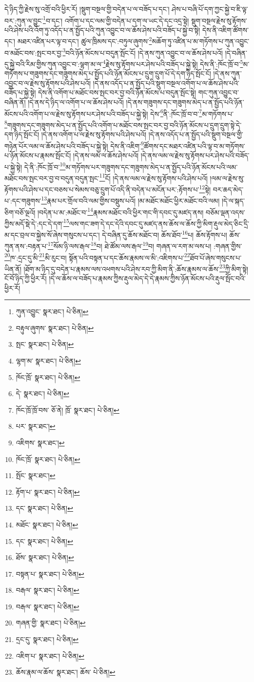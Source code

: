 དེ་ཉིད་ཀྱི་རྗེས་སུ་འགྲོ་བའི་ཕྱིར་རོ། །སྡུག་བསྔལ་གྱི་བདེན་པ་ལ་བཟོད་པ་དང་། ཤེས་པ་བཞི་པོ་དག་ཀྱང་སྐྱེ་བ་ཇི་ལྟ་བར་:ཀུན་ལ་བྱུང་\footnote{ཀུན་འབྱུང་  སྣར་ཐང་།  པེ་ཅིན། }བ་དང་། འགོག་པ་དང་ལམ་གྱི་བདེན་པ་དག་ལ་ཡང་དེ་དང་འདྲ་སྟེ། སྡུག་བསྔལ་རྗེས་སུ་རྟོགས་པའི་ཤེས་པའི་འོག་ཏུ་འདོད་པ་ན་སྤྱོད་པའི་ཀུན་འབྱུང་བ་ལ་ཆོས་ཤེས་པའི་བཟོད་པ་སྐྱེ་བ་སྟེ། དེས་ནི་འཇིག་ཚོགས་དང་། མཐར་འཛིན་པར་ལྟ་བ་དང་། ཚུལ་ཁྲིམས་དང་:བཏུལ་ཞུགས་\footnote{བརྟུལ་ཞུགས་  སྣར་ཐང་།  པེ་ཅིན། }མཆོག་ཏུ་འཛིན་པ་མ་གཏོགས་པ་ཀུན་འབྱུང་བ་མཐོང་བས་:སྤང་བར་བྱ་\footnote{སྤང་  སྣར་ཐང་།  པེ་ཅིན། }བའི་ཉོན་མོངས་པ་བདུན་སྤོང་ངོ། །དེ་ནས་ཀུན་འབྱུང་བ་ལ་ཆོས་ཤེས་པའོ། །དེ་བཞིན་དུ་སྐྱེ་བའི་རིམ་གྱིས་ཀུན་འབྱུང་བ་:ལྷག་མ་ལ་\footnote{ལྷག་མ་  སྣར་ཐང་།  པེ་ཅིན། }རྗེས་སུ་རྟོགས་པར་ཤེས་པའི་བཟོད་པ་སྐྱེ་སྟེ། དེས་ནི་:ཁོང་ཁྲོ་བ་\footnote{ཁོང་ཁྲོ་  སྣར་ཐང་།  པེ་ཅིན། }མ་གཏོགས་པ་གཟུགས་དང་གཟུགས་མེད་པ་སྤྱོད་པའི་ཉོན་མོངས་པ་དྲུག་དྲུག་པོ་དེ་དག་ཉིད་སྤོང་ངོ། །དེ་ནས་ཀུན་འབྱུང་བ་ལ་རྗེས་སུ་རྟོགས་པའི་ཤེས་པའོ། །དེ་ནས་འདོད་པ་ན་སྤྱོད་པའི་སྡུག་བསྔལ་འགོག་པ་ལ་ཆོས་ཤེས་པའི་བཟོད་པ་སྐྱེ་སྟེ། དེས་ནི་འགོག་པ་མཐོང་བས་སྤང་བར་བྱ་བའི་ཉོན་མོངས་པ་བདུན་སྤོང་སྟེ། གང་ཀུན་འབྱུང་བ་བཞིན་ནོ། །དེ་ནས་དེ་ཉིད་ལ་འགོག་པ་ལ་ཆོས་ཤེས་པའོ། །དེ་ནས་གཟུགས་དང་གཟུགས་མེད་པ་ན་སྤྱོད་པའི་ཉོན་མོངས་པའི་འགོག་པ་ལ་རྗེས་སུ་རྟོགས་པར་ཤེས་པའི་བཟོད་པ་སྐྱེ་སྟེ། དེས་\footnote{དེ་  སྣར་ཐང་།  པེ་ཅིན། }ནི་:ཁོང་ཁྲོ་བ་བ་\footnote{ཁོང་ཁྲོ་ཁྲོ་བས་  ཅོ་ནེ། ཁྲོ་  སྣར་ཐང་།  པེ་ཅིན། }མ་གཏོགས་པ་\footnote{པར་  སྣར་ཐང་། }གཟུགས་དང་གཟུགས་མེད་པ་ན་སྤྱོད་པའི་འགོག་པ་མཐོང་བས་སྤང་བར་བྱ་བའི་ཉོན་མོངས་པ་དྲུག་དྲུག་སྟེ་དེ་དག་ཉིད་སྤོང་ངོ། །དེ་ནས་འགོག་པ་ལ་རྗེས་སུ་རྟོགས་པའི་ཤེས་པའོ། །དེ་ནས་འདོད་པ་ན་སྤྱོད་པའི་སྡུག་བསྔལ་གྱི་གཉེན་པོར་ལམ་ལ་ཆོས་ཤེས་པའི་བཟོད་པ་སྐྱེ་སྟེ། དེས་ནི་འཇིག་\footnote{འཇིགས་  སྣར་ཐང་། }ཚོགས་དང་མཐར་འཛིན་པའི་ལྟ་བ་མ་གཏོགས་པ་ཉོན་མོངས་པ་རྣམས་སྤོང་ངོ། །དེ་ནས་ལམ་ལ་ཆོས་ཤེས་པའོ། །དེ་ནས་ལམ་ལ་རྗེས་སུ་རྟོགས་པར་ཤེས་པའི་བཟོད་པ་སྐྱེ་སྟེ། དེ་ནི་:ཁོང་ཁྲོ་བ་\footnote{ཁོང་ཁྲོ་  སྣར་ཐང་།  པེ་ཅིན། }མ་གཏོགས་པར་གཟུགས་དང་གཟུགས་མེད་པ་ན་སྤྱོད་པའི་ཉོན་མོངས་པའི་ལམ་མཐོང་བས་སྤང་བར་བྱ་བ་བདུན་བདུན་སྤང་\footnote{སྤོང་  སྣར་ཐང་། }ངོ། །དེ་ནས་ལམ་ལ་རྗེས་སུ་རྟོགས་པའི་ཤེས་པའོ། །ལམ་ལ་རྗེས་སུ་རྟོགས་པའི་ཤེས་པ་དང་བཅས་པ་སེམས་བཅུ་དྲུག་པོ་འདི་ནི་བདེན་པ་མངོན་པར་:རྟོགས་པ་\footnote{རྟོག་པ་  སྣར་ཐང་།  པེ་ཅིན། }སྟེ། བར་ཆད་མེད་པ་:དང་གཟུགས་\footnote{དང་  སྣར་ཐང་།  པེ་ཅིན། }རྣམ་པར་གྲོལ་བའི་ལམ་གྱིས་བསྡུས་པའོ། །མ་མཐོང་མཐོང་ཕྱིར་མཐོང་བའི་ལམ། །དེ་ལ་སྐད་ཅིག་བཅོ་ལྔའོ། །བདེན་པ་མ་:མཐོང་བ་\footnote{མཐོང་  སྣར་ཐང་།  པེ་ཅིན། }རྣམས་མཐོང་བའི་ཕྱིར་གང་གི་དབང་དུ་མཛད་ནས། བཅོམ་ལྡན་འདས་ཀྱིས་མདོ་སྡེ་དེ་:དང་དེ་དག་\footnote{དང་  སྣར་ཐང་།  པེ་ཅིན། }ལས་གང་ཟག་དེ་དང་དེའི་དབང་དུ་མཛད་ནས་ཆོས་ལ་ཆོས་ཀྱི་མིག་རྡུལ་མེད་ཅིང་དྲི་མ་དང་བྲལ་བ་སྐྱེས་སོ་ཞེས་གསུངས་པ་དང་། དེ་བཞིན་དུ་ཆོས་མཐོང་བ། ཆོས་ཐོབ་\footnote{ཐོས་  སྣར་ཐང་།  པེ་ཅིན། }པ། ཆོས་རྟོགས་པ། ཆོས་ཀུན་ནས་:བརྟན་པ་\footnote{བསྟན་པ་  སྣར་ཐང་།  པེ་ཅིན། }སོམ་ཉི་ལས་རྒལ་\footnote{བརྒལ་  སྣར་ཐང་།  པེ་ཅིན། }བ། ཐེ་ཚོམ་ལས་རྒལ་\footnote{བརྒལ་  སྣར་ཐང་།  པེ་ཅིན། }བ། གཞན་ལ་རག་མ་ལས་པ། :གཞན་གྱིས་\footnote{གཞན་གྱི་  སྣར་ཐང་།  པེ་ཅིན། }ཁ་:དྲང་དུ་མི་\footnote{དྲང་དུ་  སྣར་ཐང་།  པེ་ཅིན། }མི་རུང་བ། སྟོན་པའི་བསྟན་པ་དང་ཆོས་རྣམས་ལ་མི་:འཇིགས་པ་\footnote{འཇིག་པ་  སྣར་ཐང་།  པེ་ཅིན། }ཐོབ་པོ་ཞེས་གསུངས་པ་ཡིན་ནོ། །ཐོག་མ་ཉིད་དུ་བདེན་པ་རྣམས་ལས་འཕགས་པའི་ཤེས་རབ་ཀྱི་མིག་ནི་:ཆོས་རྣམས་ལ་ཆོས་\footnote{ཆོས་རྣམ་ལ་ཆོས་  སྣར་ཐང་། ཆོས་  པེ་ཅིན། }ཀྱི་མིག་སྟེ། ངོ་བོ་ཉིད་ཀྱི་ཕྱིར་རོ། །དེ་ལ་ཆོས་ལ་བཟོད་པ་རྣམས་ཀྱིས་རྡུལ་མེད་དེ་དེ་རྣམས་ཀྱིས་ཉོན་མོངས་པའི་རྡུལ་སྤོང་བའི་ཕྱིར་རོ། 
